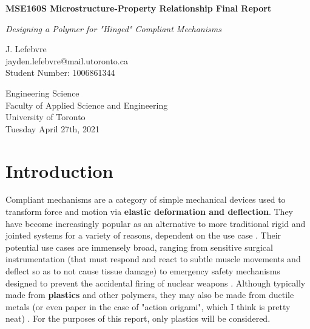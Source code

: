 \documentclass{report}
\begin{document}
\begin{titlepage}
    \begin{center}
        \vspace*{1cm}
 
        \textbf{MSE160S Microstructure-Property Relationship Final Report}
 
        \vspace{0.5cm}
        \textit{Designing a Polymer for "Hinged" Compliant Mechanisms}
             
        \vspace{1.5cm}
 
        J. Lefebvre\\\small{jayden.lefebvre@mail.utoronto.ca}\\\small{Student Number: 1006861344}
 
        \vfill
             
        \vspace{0.8cm}
             
        Engineering Science\\
        Faculty of Applied Science and Engineering\\
        University of Toronto\\
        Tuesday April 27th, 2021
             
    \end{center}
 \end{titlepage}


\section{Introduction}

Compliant mechanisms are a category of simple mechanical devices used to transform force 
and motion via \textbf{elastic deformation and deflection}. They have become increasingly 
popular as an alternative to more traditional rigid and jointed systems for a variety of 
reasons, dependent on the use case \cite{compliant}. Their potential use cases are 
immensely broad, ranging from sensitive surgical instrumentation (that must respond and 
react to subtle muscle movements and deflect so as to not cause tissue damage) to emergency 
safety mechanisms designed to prevent the accidental firing of nuclear weapons \cite{invention}.
Although typically made from \textbf{plastics} and other polymers, they may also be made 
from ductile metals (or even paper in the case of "action origami", which I think is pretty 
neat) \cite{invention}. For the purposes of this report, only plastics will be considered.
\vspace{1cm}
\end{document}
